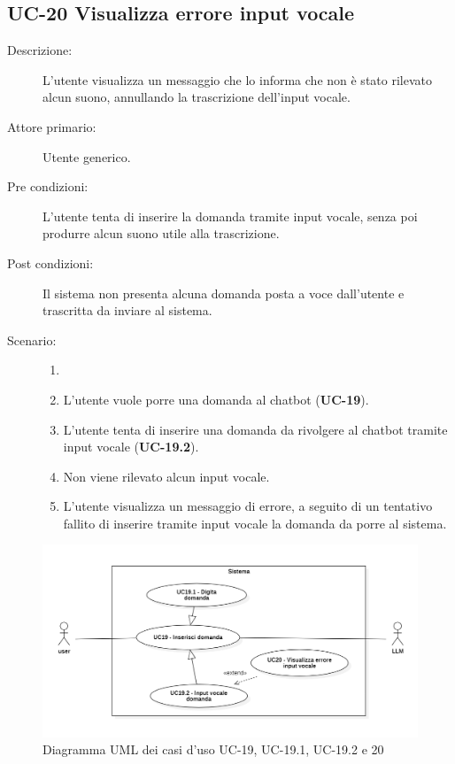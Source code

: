 \subsection{UC-20 Visualizza errore input vocale}
\begin{description}
    \item[Descrizione:] L'utente visualizza un messaggio che lo informa che non è stato rilevato alcun suono, annullando la trascrizione dell'input vocale.
    \item[Attore primario:] Utente generico.
    \item[Pre condizioni:] L'utente tenta di inserire la domanda tramite input vocale, senza poi produrre alcun suono utile alla trascrizione.
    \item[Post condizioni:] Il sistema non presenta alcuna domanda posta a voce dall'utente e trascritta da inviare al sistema.
    \item[Scenario:] 
    \begin{enumerate}
        \item[]
        \item L’utente vuole porre una domanda al chatbot (\textbf{UC-19}).
        \item L'utente tenta di inserire una domanda da rivolgere al chatbot tramite input vocale (\textbf{UC-19.2}).
        \item Non viene rilevato alcun input vocale.
        \item L'utente visualizza un messaggio di errore, a seguito di un tentativo fallito di inserire tramite input vocale la domanda da porre al sistema.
    \end{enumerate}
\end{description}

\begin{figure}[H]
    \centering
    \includegraphics[width=\linewidth]{UC19-20.png}
    \caption{Diagramma UML dei casi d'uso UC-19, UC-19.1, UC-19.2 e 20}
    \label{fig:UC19-20}
\end{figure}

